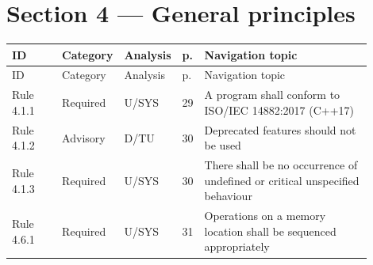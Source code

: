 \documentclass[10pt,letterpaper]{article}
\begin{document}
\section{Section 4 --- General principles}
\small\setlength{\tabcolsep}{3pt}\renewcommand{\arraystretch}{1.15}
\begin{longtable}{p{0.14\linewidth}p{0.14\linewidth}p{0.1\linewidth}p{0.045\linewidth}p{0.475\linewidth}}
\toprule
ID & Category & Analysis & p. & Navigation topic\\ \midrule
\endfirsthead
\toprule
ID & Category & Analysis & p. & Navigation topic\\ \midrule
\endhead
Rule 4.1.1 & Required & U/SYS & 29 & A program shall conform to ISO/IEC 14882:2017 (C++17)\\
Rule 4.1.2 & Advisory & D/TU & 30 & Deprecated features should not be used\\
Rule 4.1.3 & Required & U/SYS & 30 & There shall be no occurrence of undefined or critical unspecified behaviour\\
Rule 4.6.1 & Required & U/SYS & 31 & Operations on a memory location shall be sequenced appropriately\\
\bottomrule
\end{longtable}
\normalsize
\end{document}
